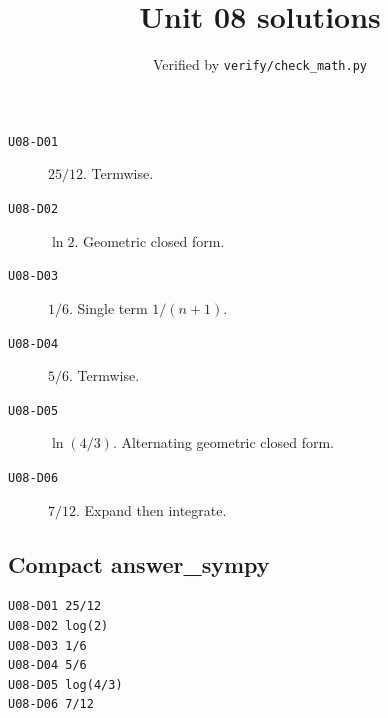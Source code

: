 
\title{Unit 08 solutions}
\author{Verified by \texttt{verify/check\_math.py}}

\maketitle
\begin{description}
\item[\texttt{U08-D01}] \(25/12\). Termwise.
\item[\texttt{U08-D02}] \(\ln 2\). Geometric closed form.
\item[\texttt{U08-D03}] \(1/6\). Single term $1/(n+1)$.
\item[\texttt{U08-D04}] \(5/6\). Termwise.
\item[\texttt{U08-D05}] \(\ln(4/3)\). Alternating geometric closed form.
\item[\texttt{U08-D06}] \(7/12\). Expand then integrate.
\end{description}
\subsection*{Compact answer\_sympy}
\begin{verbatim}
U08-D01 25/12
U08-D02 log(2)
U08-D03 1/6
U08-D04 5/6
U08-D05 log(4/3)
U08-D06 7/12
\end{verbatim}

